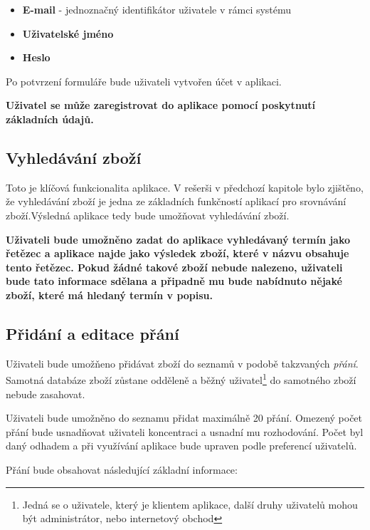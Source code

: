 \begin{itemize}
\item \textbf{E-mail} - jednoznačný identifikátor uživatele v rámci systému
\item \textbf{Uživatelské jméno}
\item \textbf{Heslo}
\end{itemize}

Po potvrzení formuláře bude uživateli vytvořen účet v aplikaci.

\textbf{Uživatel se může zaregistrovat do aplikace pomocí poskytnutí základních údajů.} 

\subsection{Vyhledávání zboží}
\label{sec:vyhledavani}
Toto je klíčová funkcionalita aplikace. V rešerši v předchozí kapitole bylo zjištěno, že vyhledávání zboží je jedna ze základních funkčností aplikací pro srovnávání zboží.Výsledná aplikace tedy bude umožňovat vyhledávání zboží.

\textbf{Uživateli bude umožněno zadat do aplikace vyhledávaný termín jako řetězec a aplikace najde jako výsledek zboží, které v názvu obsahuje tento řetězec. Pokud žádné takové zboží nebude nalezeno, uživateli bude tato informace sdělana a připadně mu bude nabídnuto nějaké zboží, které má hledaný termín v popisu.}

\subsection{Přidání a editace přání}
\label{sec:pridani-prani}
Uživateli bude umožňeno přidávat zboží do seznamů v podobě takzvaných \emph{přání}. Samotná databáze zboží zůstane odděleně a běžný uživatel\footnote{Jedná se o uživatele, který je klientem aplikace, další druhy uživatelů mohou být administrátor, nebo internetový obchod} do samotného zboží nebude zasahovat.

Uživateli bude umožněno do seznamu přidat maximálně 20 přání. Omezený počet přání bude usnadňovat uživateli koncentraci a usnadní mu rozhodování\cite{iyengar2004much}. Počet byl daný odhadem a při využívání aplikace bude upraven podle preferencí uživatelů.

Přání bude obsahovat následující základní informace:

